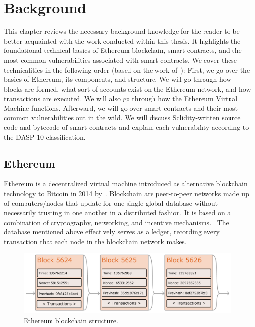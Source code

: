 
\chapter{Background}
\label{chap:background}
    This chapter reviews the necessary background knowledge for the reader to be better acquainted with the work conducted within this thesis.
    It highlights the foundational technical basics of Ethereum blockchain, smart contracts, and the most common vulnerabilities associated with smart contracts.
    We cover these technicalities in the following order (based on the work of~\cite{ferreira2022smart}):
        First, we go over the basics of Ethereum, its components, and structure.
        We will go through how blocks are formed, what sort of accounts exist on the Ethereum network, and how transactions are executed.
        We will also go through how the Ethereum Virtual Machine functions.
        Afterward, we will go over smart contracts and their most common vulnerabilities out in the wild.
        We will discuss Solidity-written source code and bytecode of smart contracts and explain each vulnerability according to the DASP 10 classification.~\cite{dasp}


\section{Ethereum}
    Ethereum is a decentralized virtual machine introduced as alternative blockchain technology to Bitcoin in 2014 by~\cite{wood2014ethereum}.
    Blockchain are peer-to-peer networks made up of computers/nodes that update for one single global database without necessarily trusting in one another in a distributed fashion.
    It is based on a combination of cryptography, networking, and incentive mechanisms.~\cite{wohrer2018smart}
    The database mentioned above effectively serves as a ledger, recording every transaction that each node in the blockchain network makes. 


    \begin{figure}
        \centering
        \includegraphics[width=\textwidth]{figures/ethereum-blocks.png}
        \caption{Ethereum blockchain structure.}
        \label{fig:ethereumBlockchainStructure}
    \end{figure}

